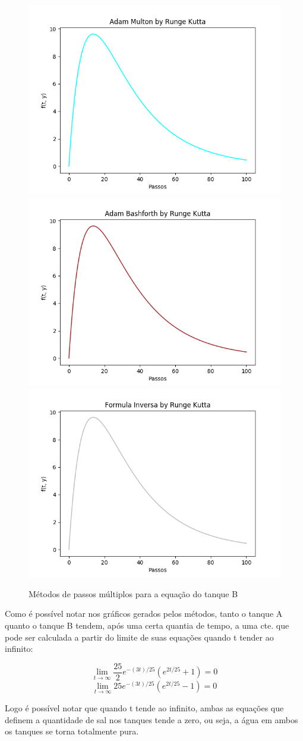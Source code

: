 \documentclass[12pt]{article}%
\begin{document}
    \begin{figure}[H]
        \begin{center}
            \includegraphics[width=.4\textwidth]{problemas/metodos_q1/tanque_b_multon.png}
            \includegraphics[width=.4\textwidth]{problemas/metodos_q1/tanque_b_bashforth.png}
            \includegraphics[width=.4\textwidth]{problemas/metodos_q1/tanque_b_inversa.png}
        \end{center}
        \caption{Métodos de passos múltiplos para a equação do tanque B}
    \end{figure}

    Como é possível notar nos gráficos gerados pelos métodos, tanto o tanque A quanto o tanque B tendem, após uma certa quantia de tempo, a uma cte. que pode ser calculada a partir do limite de suas equações quando t tender ao infinito:
    
    \[\lim_{t\to\infty} \frac{25}{2}e^{-(3t)/25}(e^{2t/25} + 1) = 0\]
    \[\lim_{t\to\infty} 25e^{-(3t)/25}(e^{2t/25} - 1) = 0\]
    
    Logo é possível notar que quando t tende ao infinito, ambas as equações que definem a quantidade de sal nos tanques tende a zero, ou seja, a água em ambos os tanques se torna totalmente pura.

    
\newpage
\end{document}
